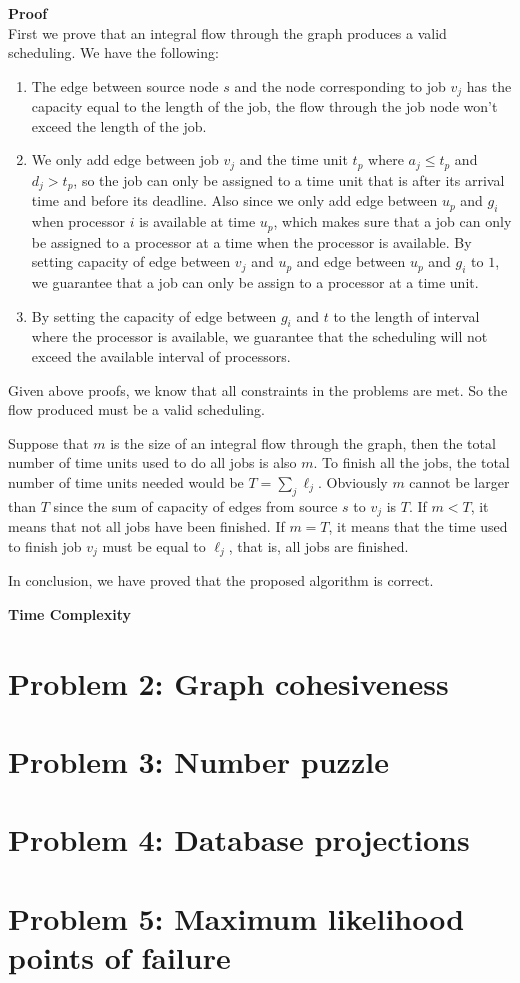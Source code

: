 \documentclass{article}
\newcommand{\Complexity}{\vspace{0.3cm} \noindent\textbf{Time Complexity} \\}
\newcommand{\Proof}{\vspace{0.3cm} \noindent\textbf{Proof} \\}
\begin{document}
\Proof
First we prove that an integral flow through the graph produces a valid scheduling. We have the
following:
\begin{enumerate}
  \item The edge between source node $s$ and the node corresponding to job $v_j$ has the capacity equal
    to the length of the job, the flow through the job node won't exceed the length of the job. 
  \item We only add edge between job $v_j$ and the time unit $t_p$ where $a_j \leq t_p$ and $d_j > t_p$, so the
    job can only be assigned to a time unit that is after its arrival time and before its deadline.
    Also since we only add edge between $u_p$ and $g_i$ when processor $i$ is available at time $u_p$,
    which makes sure that a job can only be assigned to a processor at a time when the processor is
    available. By setting capacity of edge between $v_j$ and $u_p$ and edge between $u_p$ and $g_i$
    to $1$, we guarantee that a job can only be assign to a processor at a time unit. 
  \item By setting the capacity of edge between $g_i$ and $t$ to the length of interval where the
    processor is available, we guarantee that the scheduling will not exceed the available interval
    of processors.
\end{enumerate}
Given above proofs, we know that all constraints in the problems are met. So the flow produced
must be a valid scheduling.  

Suppose that $m$ is the size of an integral flow through the graph, then the total number of time
units used to do all jobs is also $m$. To finish all the jobs, the total number of time units needed
would be $T = \sum_{j}\ell_j$. Obviously $m$ cannot be larger than $T$ since the sum of capacity
of edges from source $s$ to $v_j$ is $T$. If $m < T$, it means that not all jobs have been finished.       
If $m = T$, it means that the time used to finish job $v_j$ must be equal to $\ell_j$, that is, all
jobs are finished.

In conclusion, we have proved that the proposed algorithm is correct.

\Complexity

\section*{Problem 2: Graph cohesiveness}

\section*{Problem 3: Number puzzle}

\section*{Problem 4: Database projections}

\section*{Problem 5: Maximum likelihood points of failure}
\end{document}
